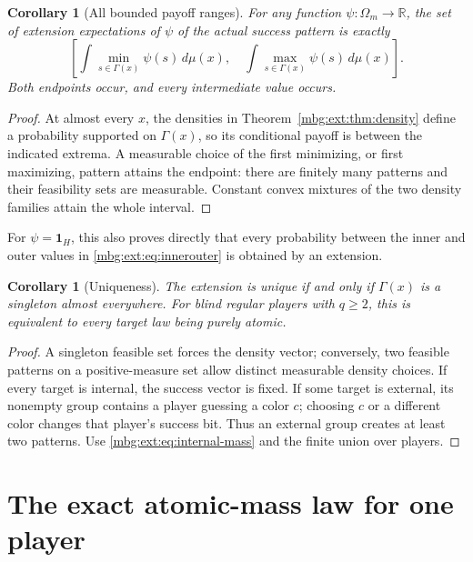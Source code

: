 \documentclass[11pt,letterpaper]{article}
\newtheorem{corollary}[theorem]{Corollary}
\theoremstyle{definition}
\newcommand{\R}{\mathbb R}
\newcommand{\ind}{\mathbf 1}
\begin{document}
\begin{corollary}[All bounded payoff ranges]
\label{mbg:ext:cor:payoff}
For any function $\psi:\Omega_m\to\R$, the set of extension expectations of $\psi$ of the actual success pattern is exactly
\begin{equation}
\left[
\int\min_{s\in\Gamma(x)}\psi(s)\,d\mu(x),\quad
\int\max_{s\in\Gamma(x)}\psi(s)\,d\mu(x)
\right].
\label{mbg:ext:eq:payoff}
\end{equation}
Both endpoints occur, and every intermediate value occurs.
\end{corollary}
\begin{proof}
At almost every $x$, the densities in Theorem~\ref{mbg:ext:thm:density} define a probability supported on $\Gamma(x)$, so its conditional payoff is between the indicated extrema. A measurable choice of the first minimizing, or first maximizing, pattern attains the endpoint: there are finitely many patterns and their feasibility sets are measurable. Constant convex mixtures of the two density families attain the whole interval.
\end{proof}

For $\psi=\ind_H$, this also proves directly that every probability between the inner and outer values in \eqref{mbg:ext:eq:innerouter} is obtained by an extension.

\begin{corollary}[Uniqueness]
\label{mbg:ext:cor:unique}
The extension is unique if and only if $\Gamma(x)$ is a singleton almost everywhere. For blind regular players with $q\ge2$, this is equivalent to every target law being purely atomic.
\end{corollary}
\begin{proof}
A singleton feasible set forces the density vector; conversely, two feasible patterns on a positive-measure set allow distinct measurable density choices. If every target is internal, the success vector is fixed. If some target is external, its nonempty group contains a player guessing a color $c$; choosing $c$ or a different color changes that player's success bit. Thus an external group creates at least two patterns. Use \eqref{mbg:ext:eq:internal-mass} and the finite union over players.
\end{proof}

\section{The exact atomic-mass law for one player}
\label{mbg:ext:sec:single}
\end{document}
